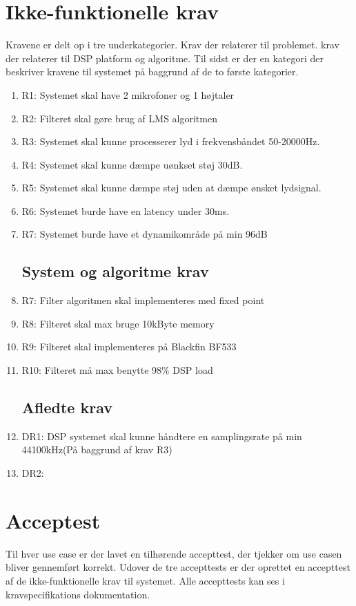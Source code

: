 \newpage
\section{Ikke-funktionelle krav}
Kravene er delt op i tre underkategorier. Krav der relaterer til problemet. krav der relaterer til DSP platform og algoritme. Til sidst er der en kategori der beskriver kravene til systemet på baggrund af de to første kategorier.
\begin{enumerate}
	
	\subsection{Problemrelateret krav}
	\item R1: Systemet skal have 2 mikrofoner og 1 højtaler
	
	\item R2: Filteret skal gøre brug af LMS algoritmen
	
	\item R3: Systemet skal kunne processerer lyd i frekvensbåndet 50-20000Hz. 
	
	\item R4: Systemet skal kunne dæmpe uønkset støj 30dB.
	
	\item R5: Systemet skal kunne dæmpe støj uden at dæmpe ønsket lydsignal.
	
	\item R6: Systemet burde have en latency under 30ms.
	
	\item R7: Systemet burde have et dynamikområde på min 96dB
	
	\subsection{System og algoritme krav}
	
	\item R7: Filter algoritmen skal implementeres med fixed point 
	
	\item R8: Filteret skal max bruge 10kByte memory
	
	\item R9: Filteret skal implementeres på Blackfin BF533
	
	\item R10: Filteret må max benytte 98\% DSP load

	\subsection{Afledte krav}
	
	\item DR1: DSP systemet skal kunne håndtere en samplingsrate på min 44100kHz(På baggrund af krav R3) 
	
	\item DR2: 
	
	
\end{enumerate}


\section{Acceptest}
Til hver use case er der lavet en tilhørende accepttest, der tjekker om use casen bliver gennemført korrekt. Udover de tre accepttests er der oprettet en accepttest af de ikke-funktionelle krav til systemet. Alle accepttests kan ses
i kravspecifikations dokumentation.